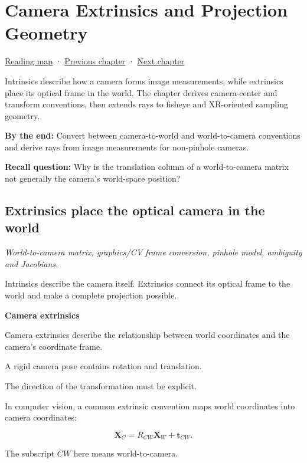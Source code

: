 \hypertarget{02-foundations-ii-ch035}{}
\chapter{Camera Extrinsics and Projection Geometry}\label{02-foundations-ii-ch035-camera-extrinsics-and-projection-geometry}

\hyperref[volume-reading-map]{Reading map} · \hyperref[02-foundations-ii-ch034-robust-predicates-and-camera-sensitivity]{Previous chapter} · \hyperref[02-foundations-ii-ch036-exposure-physical-optics-and-depth-of-field]{Next chapter}

Intrinsics describe how a camera forms image measurements, while extrinsics place its optical frame in the world. The chapter derives camera-center and transform conventions, then extends rays to fisheye and XR-oriented sampling geometry.

\textbf{By the end:} Convert between camera-to-world and world-to-camera conventions and derive rays from image measurements for non-pinhole cameras.

\textbf{Recall question:} Why is the translation column of a world-to-camera matrix not generally the camera's world-space position?

\section{Extrinsics place the optical camera in the world}\label{02-foundations-ii-ch035-extrinsics-place-the-optical-camera-in-the-world}

\emph{World-to-camera matrix, graphics/CV frame conversion, pinhole model, ambiguity and Jacobians.}

Intrinsics describe the camera itself. Extrinsics connect its optical frame to the world and make a complete projection possible.

\textbf{Camera extrinsics}

Camera extrinsics describe the relationship between world coordinates and the camera's coordinate frame.

A rigid camera pose contains rotation and translation.

The direction of the transformation must be explicit.

In computer vision, a common extrinsic convention maps world coordinates into camera coordinates:

\[
 \boxed{ \mathbf X_C=R_{CW}\mathbf X_W+\mathbf t_{CW} }.
\]

The subscript \(CW\) here means world-to-camera.

